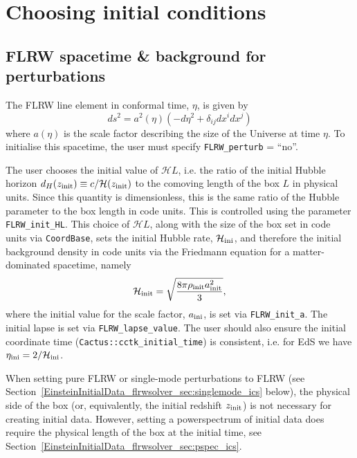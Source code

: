 \section{Choosing initial conditions}

\subsection{FLRW spacetime \& background for perturbations} \label{EinsteinInitialData_flrwsolver_sec:FLRWinit}

The FLRW line element in conformal time, $\eta$, is given by
\begin{equation}\label{EinsteinInitialData_flrwsolver_eq:FLRWmetric}
	ds^2 = a^2(\eta) \left( - d\eta^2 + \delta_{ij}dx^i dx^j \right)
\end{equation}
where $a(\eta)$ is the scale factor describing the size of the Universe at time $\eta$. To initialise this spacetime, the user must specify \texttt{FLRW\_perturb} = ``no''. 

The user chooses the initial value of $\mathcal{H}L$, i.e. the ratio of the initial Hubble horizon $d_H(z_{\rm init})\equiv c/\mathcal{H}(z_{\rm init})$ to the comoving length of the box $L$ in physical units. Since this quantity is dimensionless, this is the same ratio of the Hubble parameter to the box length in code units. This is controlled using the parameter \texttt{FLRW\_init\_HL}. 
This choice of $\mathcal{H}L$, along with the size of the box set in code units via \texttt{CoordBase}, sets the initial Hubble rate, $\mathcal{H}_{\rm ini}$, and therefore the initial background density in code units via the Friedmann equation for a matter-dominated spacetime, namely
\begin{equation}
	\mathcal{H}_{\rm init} = \sqrt{\frac{8\pi \rho_{\rm init} a_{\rm init}^2}{3}},
\end{equation}
where the initial value for the scale factor, $a_{\rm ini}$, is set via \texttt{FLRW\_init\_a}. The initial lapse is set via \texttt{FLRW\_lapse\_value}. The user should also ensure the initial coordinate time (\texttt{Cactus::cctk\_initial\_time}) is consistent, i.e. for EdS we have $\eta_{\rm ini} = 2/\mathcal{H}_{\rm ini}$.

When setting pure FLRW or single-mode perturbations to FLRW (see Section~\ref{EinsteinInitialData_flrwsolver_sec:singlemode_ics} below), the physical side of the box (or, equivalently, the initial redshift $z_{\rm init}$) is not necessary for creating initial data. However, setting a powerspectrum of initial data does require the physical length of the box at the initial time, see Section~\ref{EinsteinInitialData_flrwsolver_sec:pspec_ics}.


